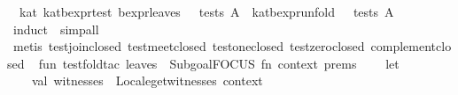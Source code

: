 \begin{isabellebody}
\endisatagproof
{\isafoldproof}%
%
\isadelimproof
\isanewline
%
\endisadelimproof
\isanewline
{}\isamarkupfalse%
\ {}\ kat{}\ kat{}bexpr{}test{}\ {}bexpr{}leaves\ {}\ {}\ tests\ A\ {}\ kat{}bexpr{}unfold\ {}\ {}\ tests\ A{}\isanewline
%
\isadelimproof
\ \ %
\endisadelimproof
%
\isatagproof
{}\isamarkupfalse%
\ {}induct\ {}{}\ simp{}all{}\isanewline
\ \ \isamarkupfalse%
\ {}metis\ test{}join{}closed\ test{}meet{}closed\ test{}one{}closed\ test{}zero{}closed\ complement{}closed{}{}%
\endisatagproof
{\isafoldproof}%
%
\isadelimproof
\isanewline
%
\endisadelimproof
%
\isadelimML
\isanewline
%
\endisadelimML
%
\isatagML
{}\isamarkupfalse%
\ {}\isanewline
\isanewline
fun\ test{}fold{}tac\ leaves\ {}\ Subgoal{}FOCUS\ {}fn\ {}context{}\ prems{}\ {}{}{}{}\ {}{}\isanewline
\ \ let\isanewline
\ \ \ \ val\ witnesses\ {}\ Locale{}get{}witnesses\ context\isanewline

\end{isabellebody}
